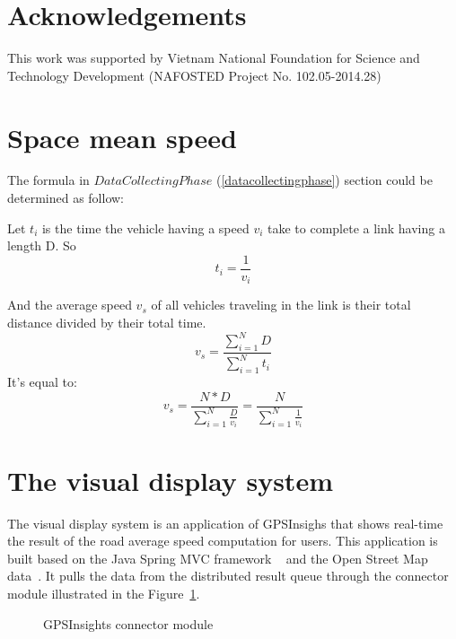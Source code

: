 \documentclass{acm_proc_article-sp}
\begin{document}
\section{Acknowledgements}
This work was supported by Vietnam National Foundation for Science and Technology Development (NAFOSTED Project No. 102.05-2014.28)
%

%
%
\appendix \label{appendix}

\section{Space mean speed}
The formula in $Data Collecting Phase$ (\ref{datacollectingphase}) section could be determined as follow:

Let $t_{i}$ is the time the vehicle having a speed $v_{i}$ take to complete a link having a length D. So
	\[ t_{i} = \frac{1}{v_{i}} \] 

And the average speed $v_{s}$ of all vehicles traveling in the link is their total distance divided by their total time.
	\[v_{s} = \frac{\sum_{i=1}^{N} D}{\sum_{i=1}^{N} t_{i}}\]
It's equal to:
	\[v_{s} = \frac{N \ast D}{\sum_{i=1}^{N} \frac{D}{v_{i}}} = \frac{N}{\sum_{i=1}^{N}\frac{1}{v_{i}}} \]

\section{The visual display system}

The visual display system is an application of GPSInsighs that shows real-time the result of the road average speed computation for users. This application is built based on the Java Spring MVC framework ~\cite{javaspringmvc} and the Open Street Map data~\cite{openstreetmap}. It pulls the data from the distributed result queue through the connector module illustrated in the Figure~\ref{fig:connectmodule}.

\begin{figure}[h]
	\centering
	\caption{GPSInsights connector module}
	\label{fig:connectmodule}
\end{figure}
\end{document}
